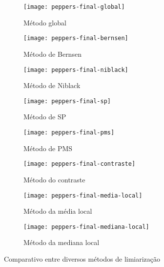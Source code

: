 \documentclass[brazilian,a4paper,twocolumn]{article}
\begin{document}
        \begin{figure}[H]
            \centering
            \begin{subfigure}{0.23\textwidth}
                \texttt{[image: peppers-final-global]}
                \caption{Método global}
                \label{fig:peppers-global}
            \end{subfigure}
            \begin{subfigure}{0.23\textwidth}
                \texttt{[image: peppers-final-bernsen]}
                \caption{Método de Bernsen}
                \label{fig:peppers-bernsen}
            \end{subfigure}
            \begin{subfigure}{0.23\textwidth}
                \texttt{[image: peppers-final-niblack]}
                \caption{Método de Niblack}
                \label{fig:peppers-niblack}
            \end{subfigure}
            \begin{subfigure}{0.23\textwidth}
                \texttt{[image: peppers-final-sp]}
                \caption{Método de SP}
                \label{fig:peppers-sp}
            \end{subfigure}
            \begin{subfigure}{0.23\textwidth}
                \texttt{[image: peppers-final-pms]}
                \caption{Método de PMS}
                \label{fig:peppers-pms}
            \end{subfigure}
            \begin{subfigure}{0.23\textwidth}
                \texttt{[image: peppers-final-contraste]}
                \caption{Método do contraste}
                \label{fig:peppers-contraste}
            \end{subfigure}
            \begin{subfigure}{0.23\textwidth}
                \texttt{[image: peppers-final-media-local]}
                \caption{Método da média local}
                \label{fig:peppers-media}
            \end{subfigure}
            \begin{subfigure}{0.23\textwidth}
                \texttt{[image: peppers-final-mediana-local]}
                \caption{Método da mediana local}
                \label{fig:peppers-mediana}
            \end{subfigure}

            \caption{Comparativo entre diversos métodos de limiarização}
            \label{fig:peppers-limiarizacao}
        \end{figure}
\end{document}
